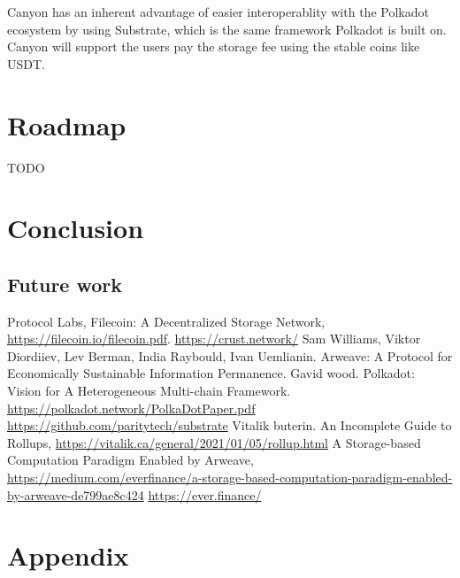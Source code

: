 \documentclass[]{article}
\begin{document}
Canyon has an inherent advantage of easier interoperablity with the Polkadot ecosystem by using Substrate, which is the same framework Polkadot is built on. Canyon will support the users pay the storage fee using the stable coins like USDT.



\section{Roadmap}

TODO

\section{Conclusion}

\subsection{Future work}

\begin{thebibliography}{99}
Protocol Labs, Filecoin: A Decentralized Storage Network, \url{https://filecoin.io/filecoin.pdf}.
\url{https://crust.network/}
Sam Williams, Viktor Diordiiev, Lev Berman, India Raybould, Ivan Uemlianin. Arweave: A Protocol for Economically Sustainable Information Permanence.
 Gavid wood. Polkadot: Vision for A Heterogeneous Multi-chain Framework. \url{https://polkadot.network/PolkaDotPaper.pdf}
\url{https://github.com/paritytech/substrate}
Vitalik buterin. An Incomplete Guide to Rollups, \url{https://vitalik.ca/general/2021/01/05/rollup.html}
A Storage-based Computation Paradigm Enabled by Arweave, \url{https://medium.com/everfinance/a-storage-based-computation-paradigm-enabled-by-arweave-de799ae8c424}
\url{https://ever.finance/}
\end{thebibliography}

\appendix
\section{Appendix}
\end{document}
